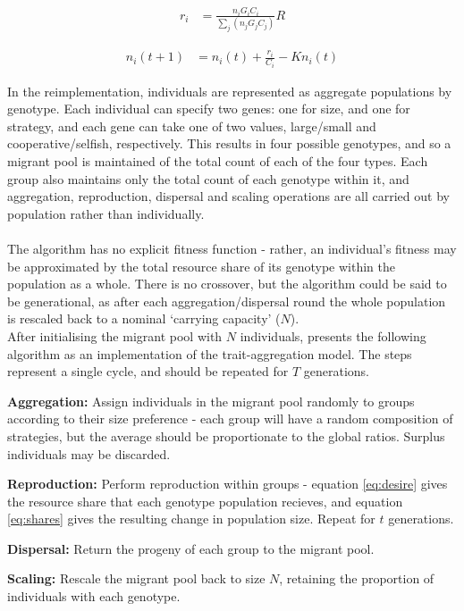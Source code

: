 \documentclass[11pt]{article}
\begin{document}
\begin{align} \label{eq:desire}
  r_i &= \frac{n_iG_iC_i}{\sum\limits_{j}(n_jG_jC_j)}R
\end{align}

\begin{align} \label{eq:shares}
  n_i(t+1) &= n_i(t) + \frac{r_i}{C_i} - Kn_i(t)
\end{align}

In the reimplementation, individuals are represented as aggregate populations by genotype. Each individual can specify two genes: one for size, and one for strategy, and each gene can take one of two values, large/small and cooperative/selfish, respectively. This results in four possible genotypes, and so a migrant pool is maintained of the total count of each of the four types. Each group also maintains only the total count of each genotype within it, and aggregation, reproduction, dispersal and scaling operations are all carried out by population rather than individually.\\
\\
The algorithm has no explicit fitness function - rather, an individual's fitness may be approximated by the total resource share of its genotype within the population as a whole. There is no crossover, but the algorithm could be said to be generational, as after each aggregation/dispersal round the whole population is rescaled back to a nominal `carrying capacity' ($N$).\\


After initialising the migrant pool with $N$ individuals, \citet{orig} presents the following algorithm as an implementation of the trait-aggregation model. The steps represent a single cycle, and should be repeated for $T$ generations.\\
\begin{compactenum}
\item\textbf{Aggregation:} Assign individuals in the migrant pool randomly to groups according to their size preference - each group will have a random composition of strategies, but the average should be proportionate to the global ratios. Surplus individuals may be discarded.
\item\textbf{Reproduction:} Perform reproduction within groups - equation \ref{eq:desire} gives the resource share that each genotype population recieves, and equation \ref{eq:shares} gives the resulting change in population size. Repeat for $t$ generations.
\item\textbf{Dispersal:} Return the progeny of each group
to the migrant pool.
\item\textbf{Scaling:} Rescale the migrant pool
back to size $N$, retaining the proportion of individuals with each genotype.
\end{compactenum}
\end{document}
